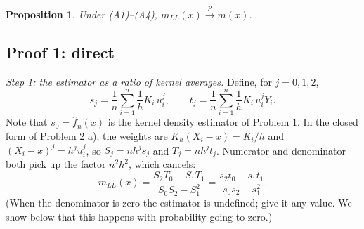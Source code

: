 \documentclass[11pt]{article}
\theoremstyle{plain}
\newtheorem{proposition}{Proposition}
\begin{document}
\begin{proposition}\label{prop:ll}
Under (A1)--(A4), $m_{LL}(x)\xrightarrow{p}m(x)$.
\end{proposition}

\subsection*{Proof 1: direct}

\emph{Step 1: the estimator as a ratio of kernel averages.} Define, for $j=0,1,2$,
\[
s_j = \frac1n\sum_{i=1}^n\frac1hK_i\,u_i^j,\qquad t_j = \frac1n\sum_{i=1}^n\frac1hK_i\,u_i^jY_i .
\]
Note that $s_0=\hat f_n(x)$ is the kernel density estimator of Problem 1. In the closed form of Problem 2 a), the weights are $K_h(X_i-x)=K_i/h$ and $(X_i-x)^j=h^ju_i^j$, so $S_j=nh^js_j$ and $T_j=nh^jt_j$. Numerator and denominator both pick up the factor $n^2h^2$, which cancels:
\begin{equation}\label{eq:llratio}
m_{LL}(x) = \frac{S_2T_0-S_1T_1}{S_0S_2-S_1^2} = \frac{s_2t_0-s_1t_1}{s_0s_2-s_1^2}.
\end{equation}
(When the denominator is zero the estimator is undefined; give it any value. We show below that this happens with probability going to zero.)
\end{document}
